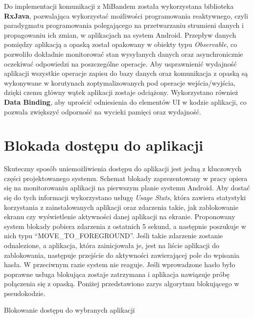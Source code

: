 \newline\newline
\indent Do implementacji komunikacji z MiBandem została wykorzystana biblioteka \textbf{RxJava}, pozwalająca wykorzystać możliwości programowania reaktywnego, czyli paradygmatu programowania polegającego na przetwarzaniu strumieni danych i propagowaniu ich zmian, w aplikacjach na system Android. Przepływ danych pomiędzy aplikacją a opaską został opakowany w obiekty typu \textit{Observable}, co pozwoliło dokładnie monitorować stan wysyłanych danych oraz asynchronicznie oczekiwać odpowiedzi na poszczególne operacje.
\newline\newline
\indent Aby usprawnienić wydajność aplikacji wszystkie operacje zapisu do bazy danych oraz komunikacja z opaską są wykonywane w korutynach zoptymalizowanych pod operacje wejścia/wyjścia, dzięki czemu główny wątek aplikacji zostaje odciążony. Wykorzystano również \textbf{Data Binding}, aby uprościć odniesienia do elementów UI w kodzie aplikacji, co pozwala zwiększyć odporność na wycieki pamięci oraz wydajność. 

\section{Blokada dostępu do aplikacji}
Skuteczny sposób uniemożliwienia dostępu do aplikacji jest jedną z kluczowych części projektowanego systemu. Schemat blokady zaprezentowany w pracy opiera się na monitorowaniu aplikacji na pierwszym planie systemu Android. Aby dostać się do tych informacji wykorzystano usługę \textit{Usage Stats}, która zawiera statystyki korzystania z zainstalowanych aplikacji oraz zdarzenia takie, jak zablokowanie ekranu czy wyświetlenie aktywności danej aplikacji na ekranie. Proponowany system blokady pobiera zdarzenia z ostatnich 5 sekund, a następnie poszukuje w nich typu ``MOVE\_TO\_FOREGROUND''. Jeśli takie zdarzenie zostanie odnalezione, a aplikacja, która zainicjowała je, jest na liście aplikacji do zablokowania, następuje przejście do aktywności zawierającej pole do wpisania hasła. W przeciwnym razie system nie reaguje. Jeśli wprowadzone hasło było poprawne usługa blokująca zostaje zatrzymana i aplikacja nawiązuje próbę połączenia się z opaską. Poniżej przedstawiono zarys algorytmu blokującego w pseudokodzie.
\newline

\begin{algorithm}[H]
    \DontPrintSemicolon
    \SetAlgoLined
    \caption{Blokowanie dostępu do wybranych aplikacji} 
    \BlankLine
    \BlankLine
\end{algorithm}

